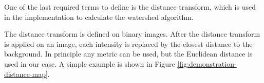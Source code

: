 \documentclass[
  digital,     %
  oneside,     %
  nosansbold,  %
  nocolorbold, %
  lof,         %
  lot,         %
]{fithesis4}
\begin{document}
One of the last required terms to define is the distance transform, which is
used in the implementation to calculate the watershed algorithm.

The distance transform is defined on binary images. After the distance transform
is applied on an image, each intensity is replaced by the closest distance to
the background. In principle any metric can be used, but the Euclidean distance
is used in our case. A simple example is shown in Figure
\ref{fig:demonstration-distance-map}.

\begin{figure}
    \begin{subfigure}[t]{0.48\textwidth}
    \end{subfigure}
    \begin{subfigure}[t]{0.48\textwidth}

\end{subfigure}
\end{figure}
\end{document}
